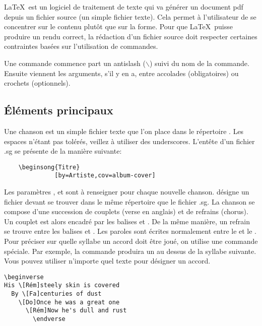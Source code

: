 \documentclass[versionenligne]{patacrep}
\begin{document}
\LaTeX\, est un logiciel de traitement de texte qui va générer un
document pdf depuis un fichier source (un simple fichier texte). Cela
permet à l'utilisateur de se concentrer sur le contenu plutôt que sur
la forme. Pour que \LaTeX\, puisse produire un rendu correct, la
rédaction d'un fichier source doit respecter certaines contraintes
basées sur l'utilisation de commandes.

Une commande commence part un antislash ($\backslash$) suivi du nom de
la commande. Ensuite viennent les arguments, s'il y en a, entre
accolades (obligatoires) ou crochets (optionnels).


\subsection{Éléments principaux}

Une chanson est un simple fichier texte  que l'on
place dans le répertoire . Les espaces n'étant
pas tolérés, veillez à utiliser des underscores. L'entête d'un fichier
.sg se présente de la manière suivante:

\begin{verbatim}
    \beginsong{Titre}
              [by=Artiste,cov=album-cover]
\end{verbatim}

Les paramètres ,  et
 sont à renseigner pour chaque nouvelle
chanson.  désigne un fichier
 devant se trouver dans le même répertoire que
le fichier .sg.  La chanson se compose d'une succession de couplets
(verse en anglais) et de refrains (chorus). Un couplet est alors
encadré par les balises  et
. De la même manière, un refrain se trouve entre
les balises  et .  Les
paroles sont écrites normalement entre le  et le
. Pour préciser sur quelle syllabe un accord doit être
joué, on utilise une commande spéciale. Par exemple, la commande
\latexcom{[Mi]} produira un  au dessus de la syllabe
suivante. Vous pouvez utiliser n'importe quel texte pour désigner un
accord.

\begin{center}
\begin{verbatim}
\beginverse
His \[Rém]steely skin is covered
  By \[Fa]centuries of dust
    \[Do]Once he was a great one
      \[Rém]Now he's dull and rust
        \endverse
\end{verbatim}
\end{center}
\end{document}
